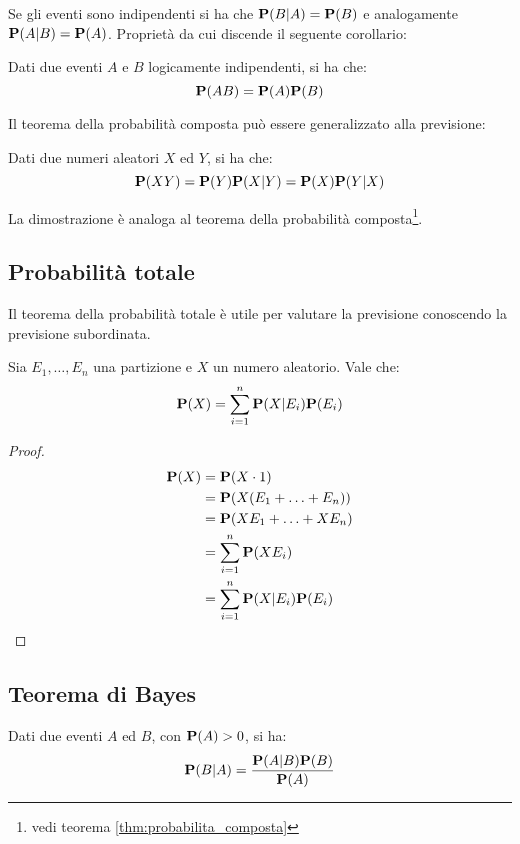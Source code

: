 Se gli eventi sono indipendenti si ha che \( \mathbf{P}(B|A) = \mathbf{P}(B) \) e analogamente \( \mathbf{P}(A|B) = \mathbf{P}(A) \). Proprietà da cui discende il seguente corollario:
\begin{corollary}
  Dati due eventi $A$ e $B$ logicamente indipendenti, si ha che:
  \[ \mathbf{P}(AB) = \mathbf{P}(A)\mathbf{P}(B) \]
\end{corollary}

Il teorema della probabilità composta può essere generalizzato alla previsione:
\begin{corollary}
  Dati due numeri aleatori $X$ ed $Y$, si ha che:
  \[ \mathbf{P}(XY) = \mathbf{P}(Y)\mathbf{P}(X|Y) = \mathbf{P}(X)\mathbf{P}(Y|X) \] %
\end{corollary}
La dimostrazione è analoga al teorema della probabilità composta\footnote{vedi teorema \ref{thm:probabilita_composta}}.


\subsection{Probabilità totale} %
Il teorema della probabilità totale è utile per valutare la previsione conoscendo la previsione subordinata.

\begin{theorem}\label{thm:probabilita_totale}
  Sia \( E_1, \ldots, E_n \) una partizione e $X$ un numero aleatorio. Vale che:
  \[ \mathbf{P}(X) = \sum_{i = 1}^{n} \mathbf{P}(X|E_i)\mathbf{P}(E_i) \]
\end{theorem}

\begin{proof}
  \begin{align*}
    \mathbf{P}(X) &= \mathbf{P}(X \cdot 1) \\
    &= \mathbf{P}(X(E_1 + \ldots + E_n)) \\
    &= \mathbf{P}(XE_1 + \ldots + XE_n) \\
    &= \sum_{i=1}^{n} \mathbf{P}(XE_i) \\
    &= \sum_{i=1}^{n} \mathbf{P}(X|E_i)\mathbf{P}(E_i)
  \end{align*}
\end{proof}


\subsection{Teorema di Bayes} %
\begin{theorem}
  Dati due eventi $A$ ed $B$, con \( \mathbf{P}(A) > 0 \), si ha:
  \[ \mathbf{P}(B|A) = \frac{\mathbf{P}(A|B)\mathbf{P}(B)}{\mathbf{P}(A)} \]
\end{theorem}

